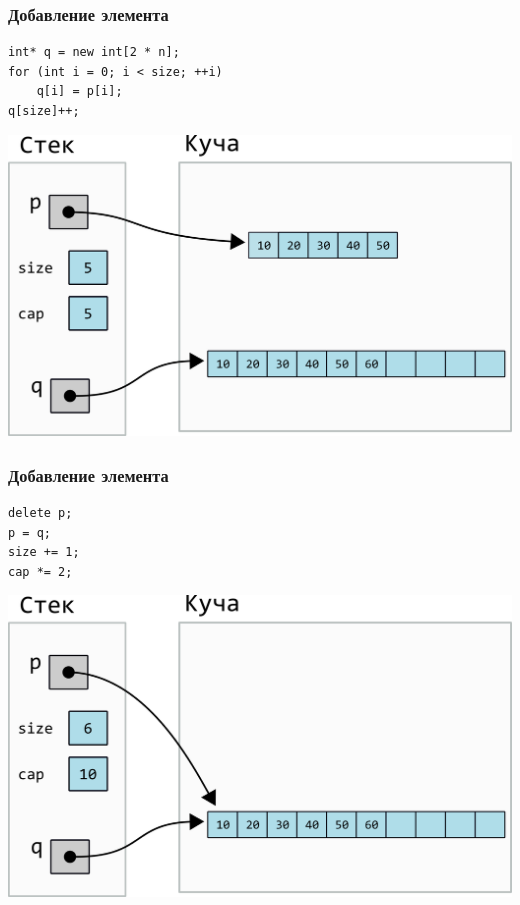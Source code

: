 \documentclass[10pt,pdf,hyperref={unicode}]{beamer}
\begin{document}
\begin{frame}[fragile]
\frametitle{Добавление элемента} 
\begin{lstlisting}
int* q = new int[2 * n];
for (int i = 0; i < size; ++i)
    q[i] = p[i];
q[size]++;
\end{lstlisting}
\begin{center}
\includegraphics[scale=0.6]{images/dynamic_array/dynamic_array_cap_add_one1.png}
\end{center}
\end{frame}


\begin{frame}[fragile]
\frametitle{Добавление элемента} 
\begin{lstlisting}
delete p;
p = q;
size += 1;
cap *= 2;
\end{lstlisting}
\begin{center}
\includegraphics[scale=0.6]{images/dynamic_array/dynamic_array_cap_add_one2.png}
\end{center}
\end{frame}
\end{document}

